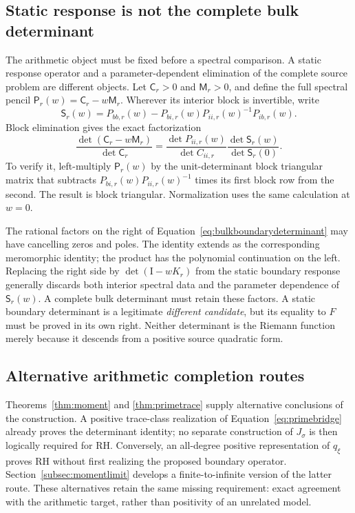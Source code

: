 \documentclass[11pt,letterpaper]{article}
\numberwithin{equation}{section}
\theoremstyle{definition}
\theoremstyle{remark}
\newcommand{\Id}{\mathrm I}
\begin{document}
\subsection{Static response is not the complete bulk determinant}
\label{subsec:spectralelimination}
The arithmetic object must be fixed before a spectral comparison. A static response operator and a parameter-dependent elimination of the complete source problem are different objects. Let $\mathsf C_r>0$ and $\mathsf M_r>0$, and define the full spectral pencil $\mathsf P_r(w)=\mathsf C_r-w\mathsf M_r$. Wherever its interior block is invertible, write
\begin{equation}
 \mathsf S_r(w)=P_{bb,r}(w)
 -P_{bi,r}(w)P_{ii,r}(w)^{-1}P_{ib,r}(w).
 \label{eq:spectralschur}
\end{equation}
Block elimination gives the exact factorization
\begin{equation}
 \frac{\det(\mathsf C_r-w\mathsf M_r)}{\det\mathsf C_r}
 =\frac{\det P_{ii,r}(w)}{\det C_{ii,r}}
  \frac{\det\mathsf S_r(w)}{\det\mathsf S_r(0)}.
 \label{eq:bulkboundarydeterminant}
\end{equation}
To verify it, left-multiply $\mathsf P_r(w)$ by the unit-determinant block triangular matrix that subtracts $P_{bi,r}(w)P_{ii,r}(w)^{-1}$ times its first block row from the second. The result is block triangular. Normalization uses the same calculation at $w=0$.

The rational factors on the right of Equation~\eqref{eq:bulkboundarydeterminant} may have cancelling zeros and poles. The identity extends as the corresponding meromorphic identity; the product has the polynomial continuation on the left. Replacing the right side by $\det(\Id-wK_r)$ from the static boundary response generally discards both interior spectral data and the parameter dependence of $\mathsf S_r(w)$. A complete bulk determinant must retain these factors. A static boundary determinant is a legitimate \emph{different candidate}, but its equality to $F$ must be proved in its own right. Neither determinant is the Riemann function merely because it descends from a positive source quadratic form.

\subsection{Alternative arithmetic completion routes}
Theorems~\ref{thm:moment} and \ref{thm:primetrace} supply alternative conclusions of the construction. A positive trace-class realization of Equation~\eqref{eq:primebridge} already proves the determinant identity; no separate construction of $J_\sigma$ is then logically required for RH. Conversely, an all-degree positive representation of $q_\xi$ proves RH without first realizing the proposed boundary operator. Section~\ref{subsec:momentlimit} develops a finite-to-infinite version of the latter route. These alternatives retain the same missing requirement: exact agreement with the arithmetic target, rather than positivity of an unrelated model.
\end{document}
